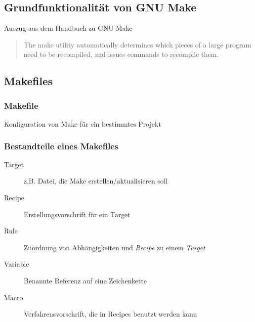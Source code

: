 \subsection{Grundfunktionalität von GNU Make}
\begin{frame}
Auszug aus dem Handbuch zu GNU Make
\begin{quote}
The make utility automatically determines which pieces of a large program need to be recompiled, and issues commands to recompile them.
\end{quote}
\end{frame}

\subsection{Makefiles}
\begin{frame}
\frametitle{Makefile} Konfiguration von Make für ein bestimmtes Projekt
\end{frame}

\begin{frame}
\frametitle{Bestandteile eines Makefiles}
\begin{description}
	\item[Target] z.B. Datei, die Make erstellen/aktualisieren soll
	\item[Recipe] Erstellungsvorschrift für ein Target
	\item[Rule] Zuordnung von Abhängigkeiten und \emph{Recipe} zu einem \emph{Target}
	\item[Variable] Benannte Referenz auf eine Zeichenkette
	\item[Macro] Verfahrensvorschrift, die in Recipes benutzt werden kann
\end{description}
\end{frame}

